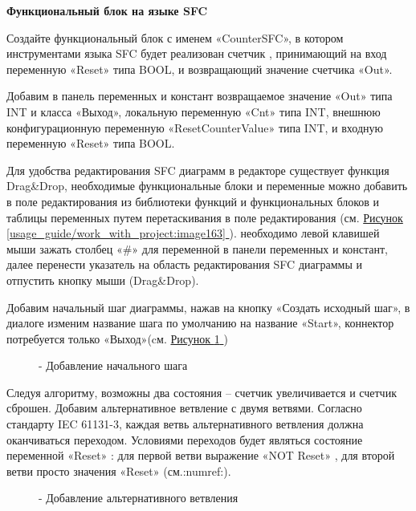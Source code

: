 \documentclass[letterpaper,10pt,russian]{sphinxmanual}
\begin{document}
\textbf{Функциональный блок на языке SFC}

Создайте функциональный блок с именем «CounterSFC», в котором
инструментами языка SFC будет реализован счетчик , принимающий на вход
переменную «Reset» типа BOOL, и возвращающий значение счетчика «Out».

Добавим в панель переменных и констант возвращаемое значение «Out» типа
INT и класса «Выход», локальную переменную «Cnt» типа INT, внешнюю
конфигурационную переменную «ResetCounterValue» типа INT, и входную
переменную «Reset» типа BOOL.

Для удобства редактирования SFC диаграмм в редакторе существует функция
Drag\&Drop, необходимые функциональные блоки и
переменные можно добавить в поле редактирования из библиотеки функций и
функциональных блоков и таблицы переменных путем
перетаскивания в поле редактирования (см. \hyperref[usage_guide/work_with_project:image163]{Рисунок \ref{usage_guide/work_with_project:image163} }). необходимо левой
клавишей мыши зажать столбец «\#» для переменной в панели переменных и
констант, далее перенести указатель на область редактирования SFC
диаграммы и отпустить кнопку мыши (Drag\&Drop).

Добавим начальный шаг диаграммы, нажав на кнопку «Создать исходный шаг»,
в диалоге изменим название шага по умолчанию на название «Start»,
коннектор потребуется только «Выход»(cм. \hyperref[usage_guide/work_with_project:image172]{Рисунок \ref{usage_guide/work_with_project:image172} })
\begin{figure}[htbp]
\centering
\capstart

\noindent{}
\caption{- Добавление начального шага}\label{usage_guide/work_with_project:image172}\end{figure}

Следуя алгоритму, возможны два состояния – счетчик увеличивается и
счетчик сброшен. Добавим альтернативное ветвление с двумя ветвями.
Согласно стандарту IEC 61131-3, каждая ветвь
альтернативного ветвления должна оканчиваться переходом. Условиями
переходов будет являться состояние переменной «Reset» : для первой ветви
выражение «NOT Reset» , для второй ветви просто значения «Reset» (см.:numref:).
\begin{figure}[htbp]
\centering
\capstart

\noindent{}
\caption{- Добавление альтернативного ветвления}\label{usage_guide/work_with_project:image173}\end{figure}
\end{document}
